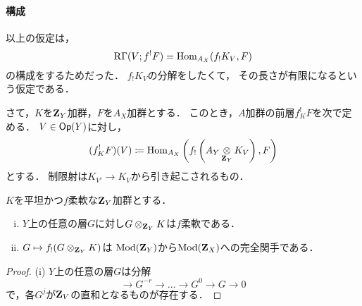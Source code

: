 \paragraph{構成}
以上の仮定は，
\[
    \mathop{\mathrm{R}\hspace{-0pt}\Gamma}\nolimits(V;f^!{F})
    =\mathop{\mathrm{Hom}}\nolimits_{A_X}({f_!}K_V,F)
\]
の構成をするためだった．
\(f_!K_V\)の分解をしたくて，
その長さが有限になるという仮定である．

さて，\(K\)を\(\mathbf{Z}_Y\)加群，\(F\)を\(A_X\)加群とする．
このとき，\(A\)加群の前層\(f^!_KF\)を次で定める．
\(V\in\mathop{\textsf{Op}}\nolimits(Y)\)に対し，
\[
    (f^!_KF)(V)
    \coloneqq
    \mathop{\mathrm{Hom}}\nolimits_{A_X}\left(f_!\left(
        A_Y\mathop{\otimes}\limits_{\mathbf{Z}_Y}K_V
    \right),F\right)
\]
とする．
制限射は\(K_{V'}\to{K_V}\)から引き起こされるもの．

\begin{LMM}
    \(K\)を平坦かつ\(f\)柔軟な\(\mathbf{Z}_Y\)加群とする．
    \begin{enumerate}[(i)]
        \item \(Y\)上の任意の層\(G\)に対し\(G\otimes_{\mathbf{Z}_Y}K\)は\(f\)柔軟である．
        \item \(G\mapsto f_!(G\otimes_{\mathbf{Z}_Y}K)\)は
        \(\mathop{\mathrm{Mod}}\nolimits(\mathbf{Z}_Y)\)から\(\mathop{\mathrm{Mod}}\nolimits(\mathbf{Z}_X)\)への完全関手である．
    \end{enumerate}
\end{LMM}
\begin{proof}
    (i) 
    \(Y\)上の任意の層\(G\)は分解
    \[
        \to{G^{-r}}\to\dots\to{G^{0}}\to{G}\to0
    \]
    で，各\(G^{j}\)が\(\mathbf{Z}_V\)の直和となるものが存在する．
\end{proof}









